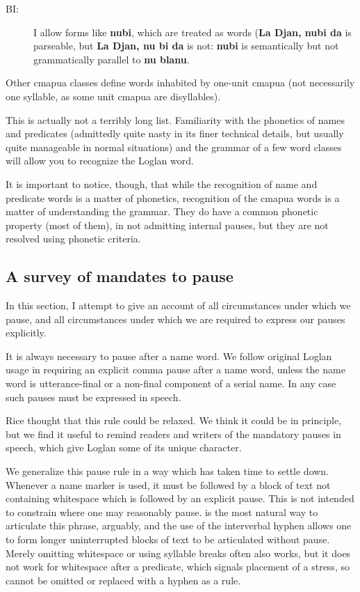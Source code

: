 \documentclass[12pt]{book}
\begin{document}
{\begin{description}
\item[BI:]  I allow forms like {\bf nubi}, which are treated as words ({\bf La Djan, nubi da} is parseable, but {\bf La Djan, nu bi da} is not:  {\bf nubi} is semantically but not grammatically parallel to {\bf nu blanu}.

\end{description}

Other cmapua classes define words inhabited by one-unit cmapua (not necessarily one syllable, as some unit cmapua are disyllables).

This is actually not a terribly long list.  Familiarity with the phonetics of names and predicates (admittedly quite nasty in its finer technical details, but usually quite manageable in normal situations) and the grammar of a few word classes will allow you to recognize the Loglan word.   

It is important to notice, though, that while the recognition of name and predicate words is a matter of phonetics, recognition of the cmapua words is a matter of understanding the grammar.  They do have a common phonetic property (most of them), in not admitting internal pauses, but they are not resolved using phonetic criteria.

\newpage

\subsection{A survey of mandates to pause}

In this section, I attempt to give an account of all circumstances under which we pause, and all circumstances under which we are required to express our pauses explicitly.

It is always necessary to pause after a name word.  We follow original Loglan usage in requiring
an explicit comma pause after a name word, unless the name word is utterance-final or a non-final component of a serial name.  In any case such pauses must be expressed in speech.

Rice thought that this rule could be relaxed.  We think it could be in principle, but we find it useful to remind readers and writers of the mandatory pauses in speech, which give Loglan some of its unique character.

We generalize this pause rule in a way which has taken time to settle down.  Whenever a name marker is used, it must be followed by a block of text not containing whitespace which is followed by an explicit pause.  This is not intended to constrain where one may reasonably pause.   is the most natural way to articulate this phrase, arguably, and the use of the interverbal hyphen allows one to form longer uninterrupted blocks of text to be articulated without pause.  Merely omitting whitespace or using syllable breaks often also works, but it does not work for whitespace after a predicate, which signals placement of a stress, so cannot be omitted or replaced with a hyphen as a rule.

}
\end{document}
